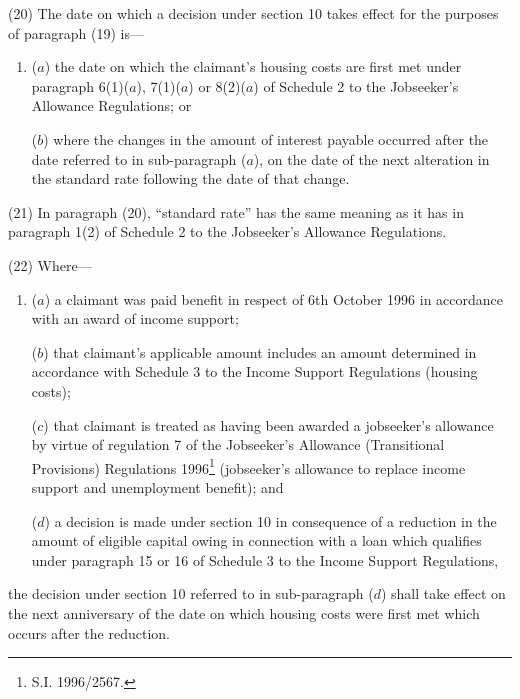 \documentclass[12pt,a4paper]{article}
\begin{document}
(20) The date on which a decision under section 10 takes effect for the purposes of paragraph (19) is—
\begin{enumerate}\item[]
($a$) the date on which the claimant’s housing costs are first met under paragraph 6(1)($a$), 7(1)($a$) or 8(2)($a$) of Schedule 2 to the Jobseeker’s Allowance Regulations; or

($b$) where the changes in the amount of interest payable occurred after the date referred to in sub-paragraph ($a$), on the date of the next alteration in the standard rate following the date of that change.
\end{enumerate}

(21) In paragraph (20), “standard rate” has the same meaning as it has in paragraph 1(2) of Schedule 2 to the Jobseeker’s Allowance Regulations.

(22) Where—
\begin{enumerate}\item[]
($a$) a claimant was paid benefit in respect of 6th October 1996 in accordance with an award of income support;

($b$) that claimant’s applicable amount includes an amount determined in accordance with Schedule 3 to the Income Support Regulations (housing costs);

($c$) that claimant is treated as having been awarded a jobseeker’s allowance by virtue of regulation 7 of the Jobseeker’s Allowance (Transitional Provisions) Regulations 1996\footnote{\frenchspacing S.I. 1996/2567.} (jobseeker’s allowance to replace income support and unemployment benefit); and

($d$) a decision is made under section 10 in consequence of a reduction in the amount of eligible capital owing in connection with a loan which qualifies under paragraph 15 or 16 of Schedule 3 to the Income Support Regulations,
\end{enumerate}
the decision under section 10 referred to in sub-paragraph ($d$) shall take effect on the next anniversary of the date on which housing costs were first met which occurs after the reduction.

\end{document}
